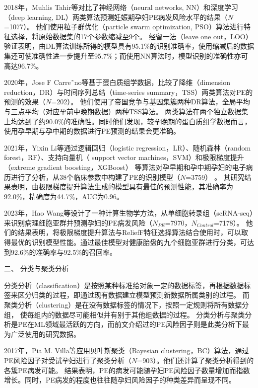 2018年，Muhlis Tahir等\cite{Tahir2018,Tahir2018-2}对比了神经网络（neural networks, NN）和深度学习（deep learning, DL）两类算法预测妊娠期孕妇PE病发风险水平的结果（$N$=1077）。
他们使用粒子群优化（particle swarm optimization, PSO）算法进行特征选择，将原始数据集的17个参数缩减至9个。
经留一法（leave one out，LOO）验证表明，由DL算法训练所得的模型具有95.1\%的识别准确率，使用缩减后的数据集还可使准确性进一步提升至95.7\%；而使用NN算法时，模型识别的准确性亦可高达96.7\%。

2020年，Jose F Carre˜no等\cite{Carreno2020}基于蛋白质组学数据，比较了降维（dimension reduction，DR）与时间序列总结（time-series summary，TSS）两类算法对PE的预测的效果（$N$=202）。
他们使用了帝国竞争与基因集簇两种DR算法，全局平均与三点平均（对应孕前中晚期数据）两种TSS算法。
两类算法在两个独立数据集上均达到了约90.0\%的准确性。同时他们发现，较孕晚期的蛋白质组学数据而言，使用孕早期与孕中期的数据进行PE预测的结果会更准确。

2021年，Yixin Li等\cite{LI2021102}通过逻辑回归（logistic regression，LR）、随机森林（random forest，RF）、支持向量机（ support vector machines，SVM）和极限梯度提升（extreme gradient boosting，XGBoost）
等算法对孕早期和孕中期孕妇的电子病历进行了分析，从38个临床参数中构建了PE的识别模型（$N$=3759） 。
其研究结果表明，由极限梯度提升算法生成的模型具有最佳的预测性能，其准确率为92.0\%，精确度为44.7\%，AUC为0.96。

2023年，Hao Wang等\cite{HW2023}设计了一种计算生物学方法，从单细胞转录组（scRNA-seq）来识别病理细胞亚群并预测孕妇的PE病发风险（$N_{PE}$=7970，$N_{Control}$=7178）。
他们的结果表明，将极限梯度提升算法与ReliefF特征选择算法结合使用时，可以取得最优的识别模型性能。通过最佳模型对健康胎盘的九个细胞亚群进行分类，可达到92.6\%的准确率与92.5\%的召回率。

二、 分类与聚类分析

分类分析（classification）是按照某种标准给对象一定的数据标签，再根据数据标签来区分归类的过程，即通过现有数据建立模型预测新数据所属类别的过程。
而聚类分析（clustering）是在没有数据标签的情况下，按照一定规则将所有数据分组，
使每组内的数据尽可能相似并有别于其他组数据的过程\cite{Han2006}。
分类分析与聚类分析是PE在ML领域最活跃的方向，而前文介绍过的PE风险因子则是此类分析下最为广泛使用的研究数据。

2017年，Pia M. Villa等\cite{Villa2017}应用贝叶斯聚类（Bayesian clustering，BC）算法，通过PE风险因子对受试孕妇进行了聚类分析（$N$=903）。他们还计算了聚类分析得到的各簇PE病发可能。
结果表明，PE的病发可能随孕妇PE风险因子数量增加而指数增长。同时，PE病发的程度也往往随孕妇风险因子的种类差异而呈现不同。

